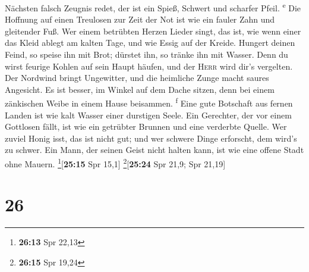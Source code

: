 Nächsten falsch Zeugnis redet, der ist ein Spieß, Schwert und scharfer
Pfeil. \textsuperscript{e}  Die Hoffnung auf einen
Treulosen zur Zeit der Not ist wie ein fauler Zahn und gleitender Fuß.
 Wer einem betrübten Herzen Lieder singt, das ist, wie
wenn einer das Kleid ablegt am kalten Tage, und wie Essig auf der
Kreide.  Hungert deinen Feind, so speise ihn mit Brot;
dürstet ihn, so tränke ihn mit Wasser.  Denn du wirst
feurige Kohlen auf sein Haupt häufen, und der \textsc{Herr} wird dir's
vergelten.  Der Nordwind bringt Ungewitter, und die
heimliche Zunge macht saures Angesicht.  Es ist besser,
im Winkel auf dem Dache sitzen, denn bei einem zänkischen Weibe in einem
Hause beisammen. \textsuperscript{f}  Eine gute Botschaft
aus fernen Landen ist wie kalt Wasser einer durstigen Seele.
 Ein Gerechter, der vor einem Gottlosen fällt, ist wie
ein getrübter Brunnen und eine verderbte Quelle.  Wer
zuviel Honig isst, das ist nicht gut; und wer schwere Dinge erforscht,
dem wird's zu schwer.  Ein Mann, der seinen Geist nicht
halten kann, ist wie eine offene Stadt ohne Mauern.
\footnote{\textbf{26:13} Spr 22,13}{[}\textbf{25:15} Spr 15,1{]}
\footnote{\textbf{26:15} Spr 19,24}{[}\textbf{25:24} Spr 21,9; Spr
21,19{]}

\hypertarget{section-25}{%
\section{26}\label{section-25}}

